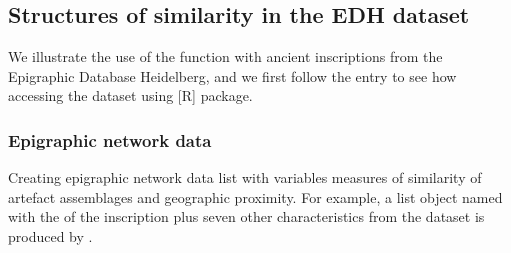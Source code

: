 \documentclass[a4paper,12pt,english]{sphinxhowto}
\begin{document}


\subsection{Structures of similarity in the EDH dataset}
\label{\detokenize{EpigraphicNetwork:structures-of-similarity-in-the-edh-dataset}}
We illustrate the use of the  function with ancient inscriptions from
the Epigraphic Database Heidelberg, and we first follow the entry {\hyperref[\detokenize{Epigraphic:edh}]{}}
to see how accessing the  dataset using  {[}R{]} package.


\begin{sphinxVerbatim}[commandchars=\\\{\},formatcom=\footnotesize]
 

 
\end{sphinxVerbatim}



\subsubsection{Epigraphic network data}
\label{\detokenize{EpigraphicNetwork:epigraphic-network-data}}
Creating epigraphic network data list with variables measures of similarity of artefact assemblages and geographic proximity.
For example, a list object named  with the  of the inscription plus seven other characteristics from
the  dataset is produced by .
\end{document}
